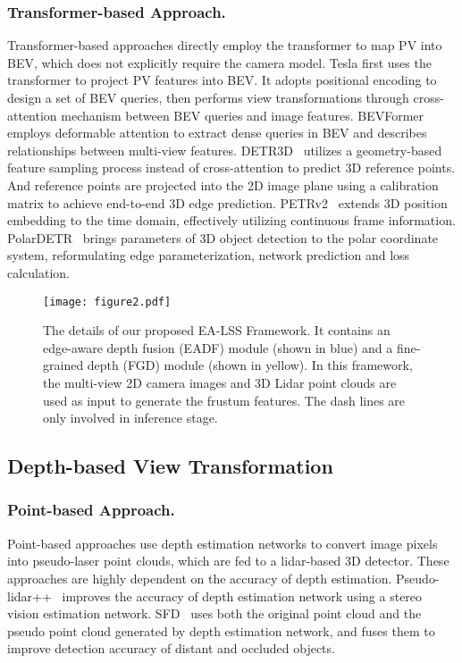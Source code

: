 \documentclass[letterpaper]{article} \usepackage[submission]{aaai24}  \usepackage{times}  \usepackage{helvet}  \usepackage{courier}  \usepackage[hyphens]{url}  \usepackage{graphicx} \urlstyle{rm} \def\UrlFont{\rm}  \usepackage{natbib}  \usepackage{caption} \frenchspacing  \setlength{\pdfpagewidth}{8.5in} \setlength{\pdfpageheight}{11in} \usepackage{algorithm}
\begin{document}
\subsubsection{Transformer-based Approach.}
Transformer-based approaches directly employ the transformer to map PV into BEV, which does not explicitly require the camera model. Tesla first uses the transformer to project PV features into BEV. It adopts positional encoding to design a set of BEV queries, then performs view transformations through cross-attention mechanism between BEV queries and image features.  BEVFormer~\cite{li2022bevformer} employs deformable attention to extract dense queries in BEV and describes relationships between multi-view features. DETR3D~\cite{wang2022detr3d} utilizes a geometry-based feature sampling process instead of cross-attention to predict 3D reference points. And reference points are projected into the 2D image plane using a calibration matrix to achieve end-to-end 3D edge prediction. PETRv2~\cite{liu2022petrv2} extends 3D position embedding to the time domain, effectively utilizing continuous frame information. PolarDETR~\cite{chen2022polar} brings parameters of 3D object detection to the polar coordinate system, reformulating edge parameterization, network prediction and loss calculation.
\begin{figure*}[t]
\begin{center}
\texttt{[image: figure2.pdf]}
\end{center}
   \caption{The details of our proposed EA-LSS Framework. It contains an edge-aware depth fusion (EADF) module (shown in blue) and a fine-grained depth (FGD) module (shown in yellow). In this framework, the multi-view 2D camera images and 3D Lidar point clouds are used as input to generate the frustum features. The dash lines are only involved in inference stage. } \label{fig:EABEV_architecture}
\end{figure*}

\subsection{Depth-based View Transformation} \label{subsection:depth-based}
\subsubsection{Point-based Approach.}
Point-based approaches use depth estimation networks to convert image pixels into pseudo-laser point clouds, which are fed to a lidar-based 3D detector. These approaches are highly dependent on the accuracy of depth estimation. Pseudo-lidar++~\cite{you2020pseudolidar++} improves the accuracy of depth estimation network using a stereo vision estimation network. SFD~\cite{wu2022sfd} uses both the original point cloud and the pseudo point cloud generated by depth estimation network, and fuses them to improve detection accuracy of distant and occluded objects.
\end{document}
